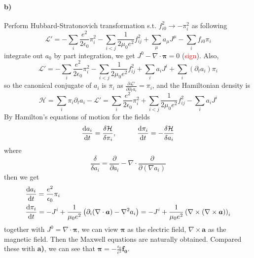 \documentclass[a4paper,11pt]{article}
\begin{document}
\paragraph{b)}
Perform Hubbard-Stratonovich transformation s.t. $f_{i0}^2 \rightarrow -\pi_i^2$ as following
\begin{equation}
    \mathcal{L'} 
    = -\sum_{i} \frac{e^2}{2\epsilon_0}\pi_i^2 
    - \sum_{i<j} \frac{1}{2\mu_0 e^2} f_{ij}^2
    + \sum_{\mu} a_{\mu}J^{\mu}
    - \sum_i f_{i0}\pi_i
\end{equation}
integrate out $a_0$ by part integration, we get $ J^0 - \nabla \cdot \bm{\pi} = 0$ (\textcolor{red}{sign}). Also, 
\begin{equation}
    \mathcal{L'} = 
    - \sum_{i} \frac{e^2}{2\epsilon_0}\pi_i^2 
    - \sum_{i<j} \frac{1}{2\mu_0 e^2} f_{ij}^2
    + \sum_{i} a_{i}J^{i}
    + \sum_{i}(\partial_t a_i)\pi_i
\end{equation}
so the canonical conjugate of $a_i$ is $\pi_i$ as $\frac{\partial \mathcal{L'}}{\partial \partial_t a_i} = \pi_i$, and the Hamiltonian density is 
\begin{equation}
    \mathcal{H}
    = \sum_i \pi_i \partial_t a_i - \mathcal{L'}
    = \sum_{i} \frac{e^2}{2\epsilon_0}\pi_i^2 
    + \sum_{i<j} \frac{1}{2\mu_0 e^2} f_{ij}^2
    - \sum_{i} a_{i}J^{i}
\end{equation}
By Hamilton's equations of motion for the fields
\begin{equation}
    \frac{{\rm d}a_{i}}{{\rm d}t} = \frac{\delta \mathcal{H}}{\delta \pi_{i}},
    \hspace{3em}
    \frac{{\rm d}\pi_{i}}{{\rm d}t} = -\frac{\delta \mathcal{H}}{\delta a_{i}}
\end{equation}
where 
\begin{equation}
    \frac{\delta}{\delta a_{i}}
    = \frac{\partial}{\partial a_i} - \nabla \cdot \frac{\partial}{\partial (\nabla a_i)}
\end{equation}
then we get 
\begin{equation}
    \begin{aligned}
        &\frac{{\rm d} a_i}{{\rm d}t} = \frac{e^2}{\epsilon_0} \pi_i\\
        &\frac{{\rm d} \pi_i}{{\rm d} t} 
        = - J^i + \frac{1}{\mu_0 e^2}  \left(\partial_i (\nabla \cdot \bm{a}) - \nabla^2 a_i\right)
        = - J^i + \frac{1}{\mu_0 e^2}  \left(\nabla \times (\nabla \times \bm{a})\right)_i
    \end{aligned}
\end{equation}
together with $J^0 = \nabla \cdot \bm{\pi}$, we can view $\bm{\pi}$ as the electric field, $\nabla \times \bm{a}$ as the magnetic field. Then the Maxwell equations are naturally obtained. Compared these with \textbf{a)}, we can see that $\bm{\pi} = - \frac{\epsilon_0}{e^2}\bm{f_0}$.
\end{document}
